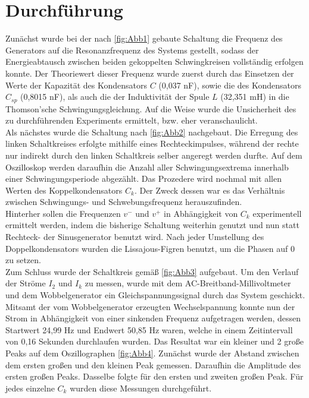 \section{Durchführung}
Zunächst wurde bei der nach \autoref{fig:Abb1} gebaute Schaltung die Frequenz des Generators auf die Resonanzfrequenz des Systems gestellt, sodass der Energieabtausch zwischen beiden gekoppelten Schwingkreisen vollständig erfolgen konnte. Der Theoriewert dieser Frequenz wurde zuerst durch das Einsetzen der Werte der Kapazität des Kondensators \(C\) (0,037 nF), sowie die des Kondensators \(C_{sp}\) (0,8015 nF), als auch die der Induktivität der Spule \(L\) (32,351 mH) in die Thomson'sche Schwingungsgleichung. Auf die Weise wurde die Unsicherheit des zu durchführenden Experiments ermittelt, bzw. eher veranschaulicht.
\\
Als nächstes wurde die Schaltung nach \autoref{fig:Abb2} nachgebaut. Die Erregung des linken Schaltkreises erfolgte mithilfe eines Rechteckimpulses, während der rechte nur indirekt durch den linken Schaltkreis selber angeregt werden durfte. Auf dem Oszilloskop werden daraufhin die Anzahl aller Schwingungsextrema innerhalb einer Schwingungsperiode abgezählt. Das Prozedere wird nochmal mit allen Werten des Koppelkondensators \(C_k\). Der Zweck dessen war es das Verhältnis zwischen Schwingungs- und Schwebungsfrequenz herauszufinden. 
\\
Hinterher sollen die Frequenzen \(v^-\) und \(v^+\) in Abhängigkeit von \(C_k\) experimentell ermittelt werden, indem die bisherige Schaltung weiterhin genutzt und nun statt Rechteck- der Sinusgenerator benutzt wird. Nach jeder Umstellung des Doppelkondensators wurden die Lissajous-Figren benutzt, um die Phasen auf 0 zu setzen. 
\\
Zum Schluss wurde der Schaltkreis gemäß \autoref{fig:Abb3} aufgebaut. Um den Verlauf der Ströme \(I_2\) und \(I_k\) zu messen, wurde mit dem AC-Breitband-Millivoltmeter und dem Wobbelgenerator ein Gleichspannungssignal durch das System geschickt. Mitsamt der vom Wobbelgenerator erzeugten Wechselspannung konnte nun der Strom in Abhängigkeit von einer sinkenden Frequenz aufgetragen werden, dessen Startwert 24,99 Hz und Endwert 50,85 Hz waren, welche in einem Zeitintervall von 0,16 Sekunden durchlaufen wurden. Das Resultat war ein kleiner und 2 große Peaks auf dem Oszillographen \autoref{fig:Abb4}. Zunächst wurde der Abstand zwischen dem ersten großen und den kleinen Peak gemessen. Daraufhin die Amplitude des ersten großen Peaks. Dasselbe folgte für den ersten und zweiten großen Peak. Für jedes einzelne \(C_k\) wurden diese Messungen durchgeführt.
